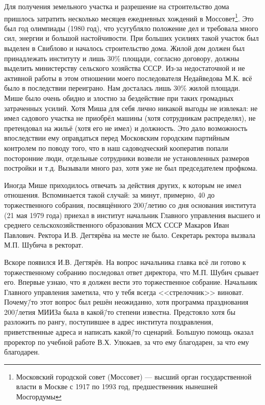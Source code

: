 Для получения земельного участка и разрешение на строительство дома пришлось затратить несколько месяцев ежедневных хождений в Моссовет\footnote{Московский городской совет (Моссовет) — высший орган государственной власти в Москве с 1917 по 1993 год, предшественник нынешней Мосгордумы}. Это был год олимпиады (1980 год), что усугубляло положение дел и требовала много сил, энергии и большой настойчивости. При больших усилиях такой участок был выделен в Свиблово и началось строительство дома. Жилой дом должен был принадлежать институту и лишь 30\% площади, согласно договору, должны выделить министерству сельского хозяйства СССР. Из-за недостаточной и не активной работы в этом отношении моего последователя Недайведова М.К. всё было в последствии переиграно. Нам досталась лишь 30\% жилой площади. Мише было очень обидно и злостно за бездействие при таких громадных затраченных усилий. Хотя Миша для себя лично никакой выгоды не извлекал: не имел садового участка не приобрёл машины (хотя сотрудникам распределял), не претендовал на жильё (хотя его не имел) и должность. Это дало возможность впоследствии ему оправдаться перед Московским городским партийным контролем по поводу того, что в наш садоводческий кооператив попали посторонние люди, отдельные сотрудники возвели не установленных размеров постройки и т.д. Вызывали много раз, хотя уже не был председателем профкома.

Иногда Мише приходилось отвечать за действия других, к которым не имел отношения. Вспоминается такой случай: за минут, примерно, 40 до торжественного собрания, посвящённого 200\=/летию со дня основания института (21 мая 1979 года) приехал в институт начальник Главного управления высшего и среднего сельскохозяйственного образования МСХ СССР Макаров Иван Павлович. Ректора И.В. Дегтярёва на месте не было. Секретарь ректора вызвала М.П. Шубича в ректорат.

Вскоре появился И.В. Дегтярёв. На вопрос начальника главка всё ли готово к торжественному собранию последовал ответ директора, что М.П. Шубич срывает его. Впервые узнаю, что я должен вести это торжественное собрание. Начальник Главного управления заметила, что у тебя всегда <<стрелочник>> виноват. Почему\=/то этот вопрос был решён неожиданно, хотя программа празднования 200\=/летия МИИЗа была в какой\=/то степени известна. Предстояло хотя бы разложить по рангу, поступившее в адрес института поздравления, приветственные адреса и написать какой\=/то сценарий. Большую помощь оказал проректор по учебной работе В.Х. Улюкаев, за что ему благодарен, за что ему благодарен.

